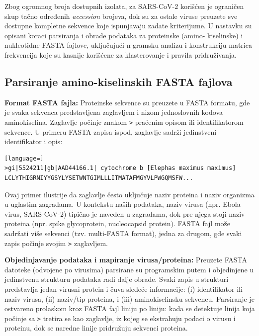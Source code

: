 \documentclass[a4paper,12pt]{article}
\begin{document}
Zbog ogromnog broja dostupnih izolata, za SARS-CoV-2 korišćen je ograničen skup tačno određenih
\textit{accession} brojeva, dok su za ostale viruse preuzete sve dostupne kompletne sekvence koje ispunjavaju
zadate kriterijume. U nastavku su opisani koraci parsiranja i obrade podataka za proteinske (amino-
kiselinske) i nukleotidne FASTA fajlove, uključujući n-gramsku analizu i konstrukciju matrica frekvencija koje
su kasnije korišćene za klasterovanje i pravila pridruživanja.

\subsection{Parsiranje amino-kiselinskih FASTA fajlova}

\textbf{Format FASTA fajla:} Proteinske sekvence su preuzete u FASTA formatu, gde je svaka sekvenca
predstavljena zaglavljem i nizom jednoslovnih kodova aminokiselina. Zaglavlje počinje znakom \texttt{>} praćenim
opisom ili identifikatorom sekvence. U primeru FASTA zapisa ispod, zaglavlje sadrži jedinstveni identifikator i opis:

\begin{lstlisting}[language=]
>gi|5524211|gb|AAD44166.1| cytochrome b [Elephas maximus maximus]
LCLYTHIGRNIYYGSYLYSETWNTGIMLLLITMATAFMGYVLPWGQMSFW...
\end{lstlisting}

Ovaj primer ilustrije da zaglavlje često uključuje naziv proteina i naziv organizma u uglastim zagradama. U kontekstu naših podataka, naziv virusa (npr. Ebola virus, SARS-CoV-2) tipično je naveden u zagradama,
dok pre njega stoji naziv proteina (npr. spike glycoprotein, nucleocapsid protein). FASTA fajl može sadržati više
sekvenci (tzv. multi-FASTA format), jedna za drugom, gde svaki zapis počinje svojim \texttt{>} zaglavljem.

\vspace{10pt}
\textbf{Objedinjavanje podataka i mapiranje virusa/proteina:} Preuzete FASTA datoteke (odvojene
po virusima) parsirane su programskim putem i objedinjene u jedinstvenu
strukturu podataka radi dalje obrade. Svaki zapis u strukturi predstavlja jedan virusni protein i čuva sledeće
informacije: (i) identifikator ili naziv virusa, (ii) naziv/tip proteina, i (iii) aminokiselinsku sekvencu. Parsiranje
je ostvareno prolaskom kroz FASTA fajl liniju po liniju: kada se detektuje linija koja počinje sa \texttt{>} tretira se
kao zaglavlje, iz kojeg se ekstrahuju podaci o virusu i proteinu, dok se naredne linije pridružuju sekvenci
proteina. 
\end{document}
